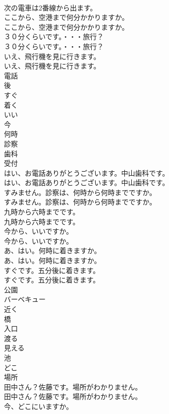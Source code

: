 \documentclass[8pt]{extreport}
\begin{document}
\begin{CJK}{UTF8}{min}
\\	次の電車は2番線から出ます。 
\\	ここから、空港まで何分かかりますか。	
\\	ここから、空港まで何分かかりますか。 
\\	３０分くらいです。・・・旅行？	
\\	３０分くらいです。・・・旅行？ 
\\	いえ、飛行機を見に行きます。	
\\	いえ、飛行機を見に行きます。 
\\	電話
\\	後
\\	すぐ
\\	着く
\\	いい
\\	今
\\	何時
\\	診察
\\	歯科
\\	受付
\\	はい、お電話ありがとうございます。中山歯科です。	
\\	はい、お電話ありがとうございます。中山歯科です。 
\\	すみません。診察は、何時から何時までですか。	
\\	すみません。診察は、何時から何時までですか。 
\\	九時から六時までです。	
\\	九時から六時までです。 
\\	今から、いいですか。	
\\	今から、いいですか。 
\\	あ、はい。何時に着きますか。	
\\	あ、はい。何時に着きますか。 
\\	すぐです。五分後に着きます。	
\\	すぐです。五分後に着きます。 
\\	公園
\\	バーベキュー
\\	近く
\\	橋
\\	入口
\\	渡る
\\	見える
\\	池
\\	どこ
\\	場所
\\	田中さん？佐藤です。場所がわかりません。	
\\	田中さん？佐藤です。場所がわかりません。 
\\	今、どこにいますか。	

\end{CJK}
\end{document}
